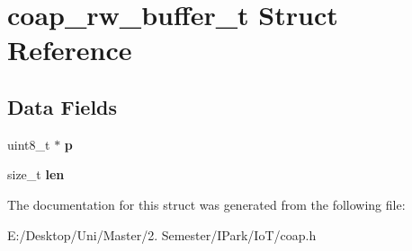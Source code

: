 \hypertarget{structcoap__rw__buffer__t}{}\section{coap\+\_\+rw\+\_\+buffer\+\_\+t Struct Reference}
\label{structcoap__rw__buffer__t}
\subsection*{Data Fields}
\begin{DoxyCompactItemize}
\item 
\mbox{\label{structcoap__rw__buffer__t_a7c863cf539485c3aa74d331e9f53fae2}} 
uint8\+\_\+t $\ast$ {\bfseries p}
\item 
\mbox{\label{structcoap__rw__buffer__t_a7360b55975153b822efc5217b7734e6a}} 
size\+\_\+t {\bfseries len}
\end{DoxyCompactItemize}


The documentation for this struct was generated from the following file\+:\begin{DoxyCompactItemize}
\item 
E\+:/\+Desktop/\+Uni/\+Master/2. Semester/\+I\+Park/\+Io\+T/coap.\+h\end{DoxyCompactItemize}

